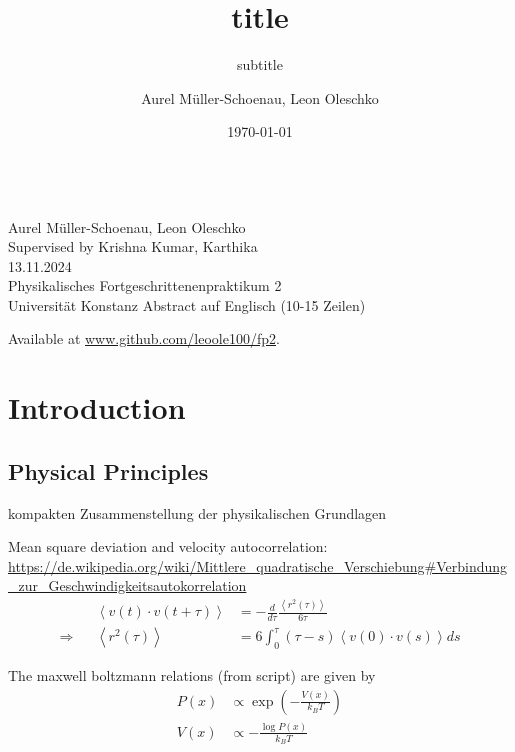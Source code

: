 \documentclass[
    parskip=half, 
    twoside=false,
    twocolumn=true,
    fontsize=11pt,
]{scrarticle}
\begin{document}
\title{title}
\subtitle{subtitle}
\author{Aurel Müller-Schoenau, Leon Oleschko}
\date{\dotdate\today}


\begin{titlepage}
    \sffamily
    \vspace*{3cm}
    {
        \fontsize{32}{32}
    }
    \vspace{.25cm}\\
    {
        \Large
        Aurel Müller-Schoenau, Leon Oleschko\\
        Supervised by Krishna Kumar, Karthika
        \vspace{.05cm}\\
        13.11.2024
        \vspace{.25cm}\\
        \normalsize
        Physikalisches Fortgeschrittenenpraktikum 2\\
        Universität Konstanz
    }
    \vfill
    {
        \normalfont\normalsize
        Abstract auf Englisch (10-15 Zeilen)
        \blindtext[2]
    }
    \vfill
    \begin{flushright}
        Available at \url{www.github.com/leoole100/fp2}.
    \end{flushright}
\end{titlepage}

\section{Introduction}

\subsection{Physical Principles}
kompakten Zusammenstellung der physikalischen Grundlagen

Mean square deviation and velocity autocorrelation:
\url{https://de.wikipedia.org/wiki/Mittlere_quadratische_Verschiebung#Verbindung_zur_Geschwindigkeitsautokorrelation}
\begin{align}
    &&\left<v(t)\cdot v(t+\tau)\right> &= - \frac{d}{d\tau} \frac{\left<r^2(\tau)\right>}{6\tau}\\
    \Rightarrow&&\left<r^2(\tau)\right> &= 6 \int_0^\tau (\tau - s) \left<v(0) \cdot v(s)\right> ds
\end{align}

The maxwell boltzmann relations (from script) are given by
\begin{align}
    P(x) &\propto \exp\left(- \frac{V(x)}{k_B T}\right)\\
    V(x) &\propto - \frac{\log{P(x)}}{k_B T}
\end{align}
\end{document}
